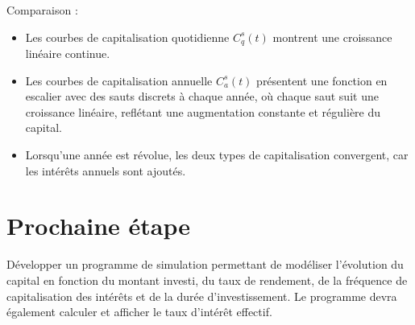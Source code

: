 \documentclass{article}
\begin{document}
\begin{enumerate}[label=\textbf{Q\arabic*.}]
    Comparaison :
    \begin{itemize}
        \item Les courbes de capitalisation quotidienne $C_q^s(t)$ montrent une croissance linéaire continue.
        \item Les courbes de capitalisation annuelle $C_a^s(t)$ présentent une fonction en escalier avec des sauts discrets à chaque année, où chaque saut suit une croissance linéaire, reflétant une augmentation constante et régulière du capital.
        \item Lorsqu'une année est révolue, les deux types de capitalisation convergent, car les intérêts annuels sont ajoutés.
    \end{itemize}
\end{enumerate}


\section{Prochaine étape}  
Développer un programme de simulation permettant de modéliser l'évolution du capital en fonction du montant investi, du taux de rendement, de la fréquence de capitalisation des intérêts et de la durée d'investissement. Le programme devra également calculer et afficher le taux d'intérêt effectif.  
\end{document}

